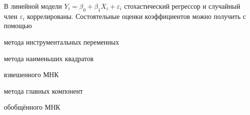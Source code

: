 
\begin{question}
В линейной модели \(Y_i = \beta_0 + \beta_1 X_i + \varepsilon_i\)
стохастический регрессор и случайный член \(\varepsilon_i\)
коррелированы. Состоятельные оценки коэффициентов можно получить с
помощью
\begin{answerlist}
  \item метода инструментальных переменных
  \item метода наименьших квадратов
  \item взвешенного МНК
  \item метода главных компонент
  \item обобщённого МНК
\end{answerlist}
\end{question}



